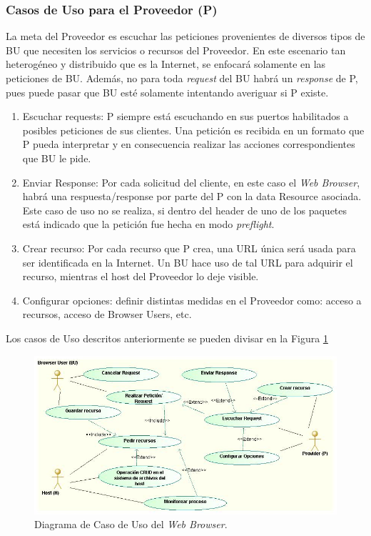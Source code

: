 		\subsubsection{Casos de Uso para el Proveedor (P)}
		La meta del Proveedor es escuchar las peticiones provenientes de diversos tipos de BU que necesiten los servicios o recursos del Proveedor. En este escenario tan heterogéneo y distribuido que es la Internet, se enfocará solamente en las peticiones de BU. Además, no para toda \textit{request} del BU habrá un \textit{response} de P, pues puede pasar que BU esté solamente intentando averiguar si P existe.
			\begin{enumerate}
				\item Escuchar requests: P siempre está escuchando en sus puertos habilitados a posibles peticiones de sus clientes. Una petición es recibida en un formato que P pueda interpretar y en consecuencia realizar las acciones correspondientes que BU le pide. 
				\item Enviar Response: Por cada solicitud del cliente, en este caso el \textit{Web Browser}, habrá una respuesta/response por parte del P con la data Resource asociada. Este caso de uso no se realiza, si dentro del header de uno de los paquetes está indicado que la petición fue hecha en modo \textit{preflight}.
				\item Crear recurso: Por cada recurso que P crea, una URL única será usada para ser identificada en la Internet. Un BU hace uso de tal URL para adquirir el recurso, mientras el host del Proveedor lo deje visible.
				\item Configurar opciones: definir distintas medidas en el Proveedor como: acceso a recursos, acceso de Browser Users, etc.
			\end{enumerate}

		Los casos de Uso descritos anteriormente se pueden divisar en la Figura \ref{fig:CUBrowser}
	\begin{landscape}
	    \begin{figure}[h!t]
	        \centering
	        \includegraphics[scale=0.77]{figures/chap4/UCBrowser.jpg}
	        \caption{Diagrama de Caso de Uso del \textit{Web Browser}.}
	        \label{fig:CUBrowser}
	    \end{figure}
	\end{landscape}


